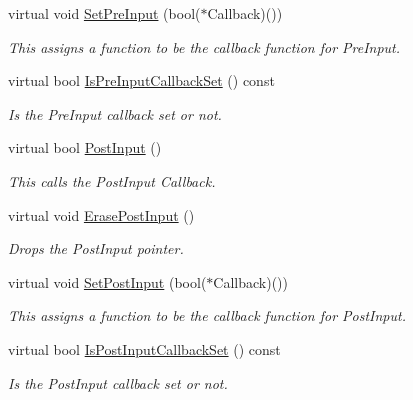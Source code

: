 \begin{DoxyCompactItemize}
virtual void \hyperlink{classphys_1_1CallBackManager_a1efb0c185304376986093beebf08a277}{SetPreInput} (bool($\ast$Callback)())
\begin{DoxyCompactList}\small\item\em This assigns a function to be the callback function for PreInput. \item\end{DoxyCompactList}\item 
virtual bool \hyperlink{classphys_1_1CallBackManager_adf39c71f0be97bcceb364621d1ccd77e}{IsPreInputCallbackSet} () const 
\begin{DoxyCompactList}\small\item\em Is the PreInput callback set or not. \item\end{DoxyCompactList}\item 
virtual bool \hyperlink{classphys_1_1CallBackManager_a83afb36cfc7e71863d68a8b4c1d5e9d2}{PostInput} ()
\begin{DoxyCompactList}\small\item\em This calls the PostInput Callback. \item\end{DoxyCompactList}\item 
virtual void \hyperlink{classphys_1_1CallBackManager_a84ccf382be58b42439869ec9b77a0f89}{ErasePostInput} ()
\begin{DoxyCompactList}\small\item\em Drops the PostInput pointer. \item\end{DoxyCompactList}\item 
virtual void \hyperlink{classphys_1_1CallBackManager_abbf73a7199a64d6a2a39c7de44c5acd6}{SetPostInput} (bool($\ast$Callback)())
\begin{DoxyCompactList}\small\item\em This assigns a function to be the callback function for PostInput. \item\end{DoxyCompactList}\item 
virtual bool \hyperlink{classphys_1_1CallBackManager_afa96dbc0779e5fa386546502b3db6c39}{IsPostInputCallbackSet} () const 
\begin{DoxyCompactList}\small\item\em Is the PostInput callback set or not. \item\end{DoxyCompactList}\item 

\end{DoxyCompactItemize}
